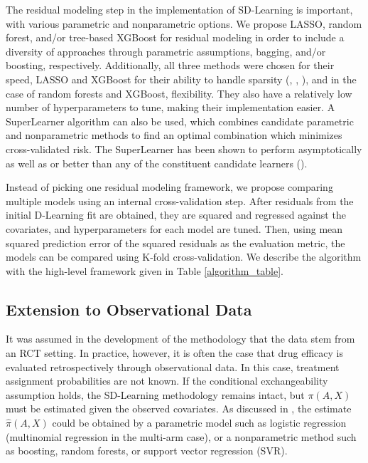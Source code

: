 \documentclass[useAMS,usenatbib]{biom}
\begin{document}
The residual modeling step in the implementation of SD-Learning is important, with various parametric and nonparametric options. We propose LASSO, random forest, and/or tree-based XGBoost for residual modeling in order to include a diversity of approaches through parametric assumptions, bagging, and/or boosting, respectively. Additionally, all three methods were chosen for their speed, LASSO and XGBoost for their ability to handle sparsity (\cite{zhang_sparsity_2008}, \cite{fauzan_accuracy_2018}, \cite{chen_xgboost_2016}), and in the case of random forests and XGBoost, flexibility. They also have a relatively low number of hyperparameters to tune, making their implementation easier. A SuperLearner algorithm can also be used, which combines candidate parametric and nonparametric methods to find an optimal combination which minimizes cross-validated risk. The SuperLearner has been shown to perform asymptotically as well as or better than any of the constituent candidate learners (\cite{van_der_laan_super_2007}).

Instead of picking one residual modeling framework, we propose comparing multiple models using an internal cross-validation step. After residuals from the initial D-Learning fit are obtained, they are squared and regressed against the covariates, and hyperparameters for each model are tuned. Then, using mean squared prediction error of the squared residuals as the evaluation metric, the models can be compared using K-fold cross-validation. We describe the algorithm with the high-level framework given in Table \ref{algorithm_table}.

\subsection{Extension to Observational Data} \label{subsec_sdlearn_observational}

It was assumed in the development of the methodology that the data stem from an RCT setting. In practice, however, it is often the case that drug efficacy is evaluated retrospectively through observational data. In this case, treatment assignment probabilities are not known. If the conditional exchangeability assumption holds, the SD-Learning methodology remains intact, but $\pi(A,X)$ must be estimated given the observed covariates. As discussed in \citet*{chen_personalized_2016}, the estimate $\hat{\pi}(A,X)$ could be obtained by a parametric model such as logistic regression (multinomial regression in the multi-arm case), or a nonparametric method such as boosting, random forests, or support vector regression (SVR). 
\end{document}
